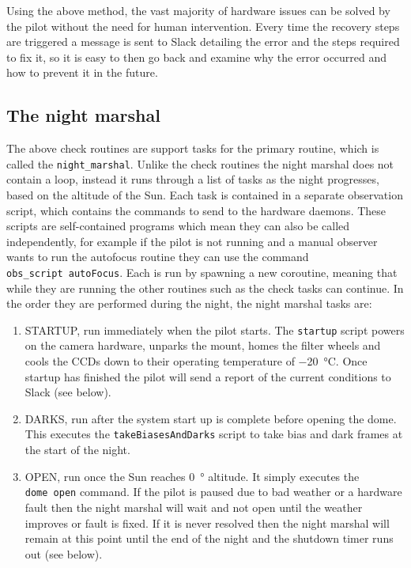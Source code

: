 \begin{colsection}
\begin{colsection}
Using the above method, the vast majority of hardware issues can be solved by the pilot without the need for human intervention. Every time the recovery steps are triggered a message is sent to Slack detailing the error and the steps required to fix it, so it is easy to then go back and examine why the error occurred and how to prevent it in the future.

\end{colsection}

\subsection{The night marshal}
\label{sec:night_marshal}
\begin{colsection}

The above check routines are support tasks for the primary routine, which is called the \texttt{night\_marshal}. Unlike the check routines the night marshal does not contain a loop, instead it runs through a list of tasks as the night progresses, based on the altitude of the Sun. Each task is contained in a separate  observation script, which contains the commands to send to the hardware daemons. These scripts are self-contained programs which mean they can also be called independently, for example if the pilot is not running and a manual observer wants to run the autofocus routine they can use the command \texttt{obs\_script~autoFocus}. Each is run by spawning a new coroutine, meaning that while they are running the other routines such as the check tasks can continue. In the order they are performed during the night, the night marshal tasks are:

\begin{enumerate}

\item STARTUP, run immediately when the pilot starts. The \texttt{startup} script powers on the camera hardware, unparks the mount, homes the filter wheels and cools the CCDs down to their operating temperature of \SI{-20}{\celsius}. Once startup has finished the pilot will send a report of the current conditions to Slack (see  below).

\item DARKS, run after the system start up is complete before opening the dome. This executes the \texttt{takeBiasesAndDarks} script to take bias and dark frames at the start of the night. 

\item OPEN, run once the Sun reaches \SI{0}{\degree} altitude. It simply executes the \texttt{dome~open} command. If the pilot is paused due to bad weather or a hardware fault then the night marshal will wait and not open until the weather improves or fault is fixed. If it is never resolved then the night marshal will remain at this point until the end of the night and the shutdown timer runs out (see below).


\end{enumerate}
\end{colsection}
\end{colsection}
